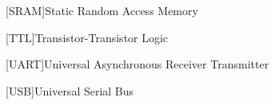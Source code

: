 \begin{acronym}
	[SRAM]{Static Random Access Memory}
\end{acronym}

\begin{acronym}
	[TTL]{Transistor-Transistor Logic}
\end{acronym}

\begin{acronym}
	[UART]{Universal Asynchronous Receiver Transmitter}
\end{acronym}

\begin{acronym}
	[USB]{Universal Serial Bus}
\end{acronym}










